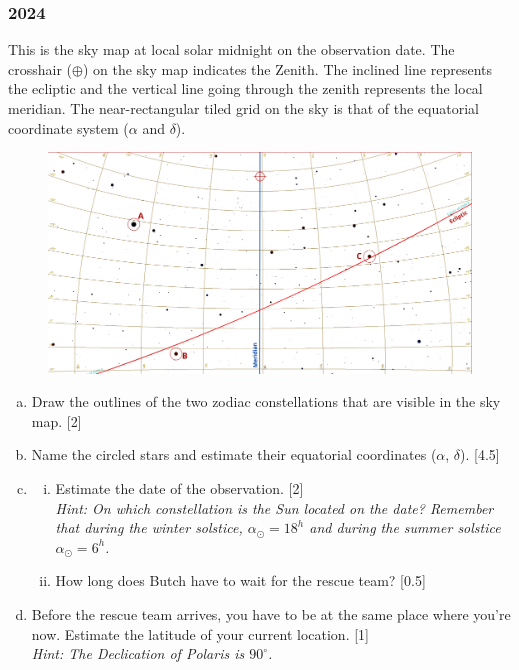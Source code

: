 \documentclass[a4paper,12pt]{extarticle}
\begin{document}
\subsubsection{2024}

This is the sky map at local solar midnight on the observation date. The crosshair ($\oplus$) on the sky map indicates the Zenith. The inclined line represents the ecliptic and the vertical line going through the zenith represents the local meridian. The near-rectangular tiled grid on the sky is that of the equatorial coordinate system ($\alpha$ and $\delta$).

\begin{figure}[htpb]
	\centering
	\includegraphics[width=.99\textwidth]{Obs_Sr24.png}
\end{figure}

\begin{enumerate}[(a)]
	\item Draw the outlines of the two zodiac constellations that are visible in the sky map. \hfill[2]
	\item Name the circled stars and estimate their equatorial coordinates ($\alpha$, $\delta$). \hfill[4.5]
	\item 
	\begin{enumerate}[(i)]
		\item Estimate the date of the observation. \hfill[2]\\
		\textit{Hint: On which constellation is the Sun located on the date? Remember that during the winter solstice, $\alpha_\odot = 18^h$ and during the summer solstice $\alpha_\odot = 6^h$.}
		\item How long does Butch have to wait for the rescue team? \hfill[0.5]
	\end{enumerate}
	\item Before the rescue team arrives, you have to be at the same place where you're now. Estimate the latitude of your current location. \hfill[1]\\
	\textit{Hint: The Declication of Polaris is $90^\circ$.}
\end{enumerate}
\end{document}
